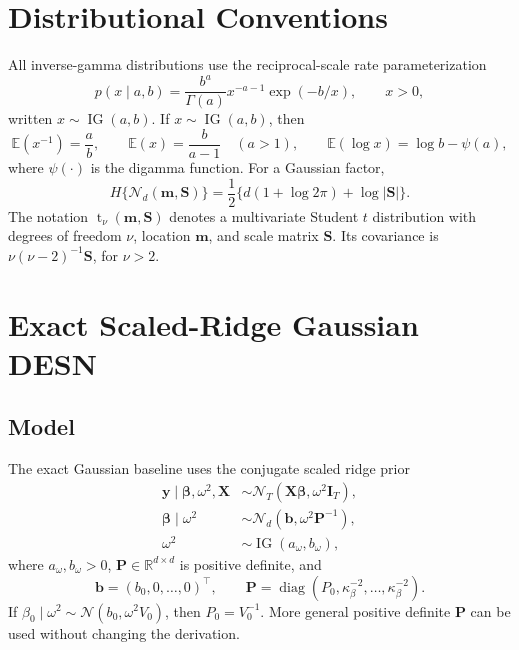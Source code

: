 \documentclass[11pt]{article}
\newcommand{\R}{\mathbb{R}}
\newcommand{\E}{\mathbb{E}}
\newcommand{\diag}{\operatorname{diag}}
\newcommand{\vect}[1]{\bm{#1}}
\newcommand{\mat}[1]{\bm{#1}}
\newcommand{\Normal}{\mathcal{N}}
\newcommand{\IG}{\operatorname{IG}}
\newcommand{\StudentT}{\operatorname{t}}
\begin{document}
\section{Distributional Conventions}
\label{sec:dist_conventions}

All inverse-gamma distributions use the reciprocal-scale rate parameterization
\begin{equation}
\label{eq:ig_density}
p(x\mid a,b)=\frac{b^a}{\Gamma(a)}x^{-a-1}\exp(-b/x),
\qquad x>0,
\end{equation}
written \(x\sim\IG(a,b)\). If \(x\sim\IG(a,b)\), then
\begin{equation}
\label{eq:ig_moments}
\E(x^{-1})=\frac{a}{b},
\qquad
\E(x)=\frac{b}{a-1}\quad(a>1),
\qquad
\E(\log x)=\log b-\psi(a),
\end{equation}
where \(\psi(\cdot)\) is the digamma function. For a Gaussian factor,
\begin{equation}
\label{eq:normal_entropy}
H\{\Normal_d(\vect m,\mat S)\}
=\frac12\{d(1+\log 2\pi)+\log|\mat S|\}.
\end{equation}
The notation \(\StudentT_\nu(\vect m,\mat S)\) denotes a multivariate Student
\(t\) distribution with degrees of freedom \(\nu\), location \(\vect m\), and
scale matrix \(\mat S\). Its covariance is \(\nu(\nu-2)^{-1}\mat S\), for
\(\nu>2\).

\section{Exact Scaled-Ridge Gaussian DESN}
\label{sec:scaled_ridge}

\subsection{Model}
\label{subsec:model}

The exact Gaussian baseline uses the conjugate scaled ridge prior
\begin{align}
\vect y\mid\vect\beta,\omega^2,\mat X
&\sim \Normal_T(\mat X\vect\beta,\omega^2\mat I_T),
\label{eq:likelihood}\\
\vect\beta\mid\omega^2
&\sim \Normal_d(\vect b,\omega^2\mat P^{-1}),
\label{eq:scaled_prior}\\
\omega^2&\sim\IG(a_\omega,b_\omega),
\label{eq:omega_prior}
\end{align}
where \(a_\omega,b_\omega>0\), \(\mat P\in\R^{d\times d}\) is positive
definite, and
\begin{equation}
\label{eq:b_P_definition}
\vect b=(b_0,0,\ldots,0)^\top,
\qquad
\mat P=\diag(P_0,\kappa_\beta^{-2},\ldots,\kappa_\beta^{-2}).
\end{equation}
If
\(\beta_0\mid\omega^2\sim\Normal(b_0,\omega^2V_0)\), then
\(P_0=V_0^{-1}\). More general positive definite \(\mat P\) can be used without
changing the derivation.
\end{document}
